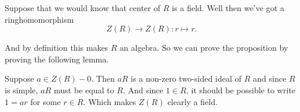 Suppose that we would know that center of $R$ is a field. Well then we've got a ringhomomorphism 
\[Z(R) \to Z(R) : r \mapsto r .\]
\par And by definition this makes $R$ an algebra. So we can prove the proposition by proving the following lemma. 

Suppose $a\in Z(R)-{0}$. Then $aR$ is a non-zero two-sided ideal of $R$ and since $R$ is simple, $aR$ must be equal to $R$. And since $1 \in R$, it should be possible to write $1 = ar$ for some $r\in R$. Which makes $Z(R)$ clearly a field. 
